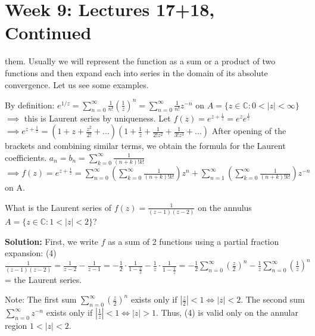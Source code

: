 \documentclass[12pt]{article}
\begin{document}
\section{Week 9: Lectures 17+18, Continued}

them. Usually we will represent the function as a sum or a product of two functions and then expand each into series in the domain of its absolute convergence. Let us see some examples.

\begin{example}
By definition: $e^{1/z} = \sum_{n=0}^\infty \frac{1}{n!}(\frac{1}{z})^n = \sum_{n=0}^\infty \frac{1}{n!}z^{-n}$ on $A = \{z \in \mathbb{C}: 0 < |z| < \infty\}$
$\implies$ this is Laurent series by uniqueness. Let $f(z) = e^{z + \frac{1}{z}} = e^z e^{\frac{1}{z}}$
$\implies e^{z + \frac{1}{z}} = (1 + z + \frac{z^2}{2!} + ...) (1 + \frac{1}{z} + \frac{1}{2!z^2} + \frac{1}{3!z^3} + ...)$
After opening of the brackets and combining similar terms, we obtain the formula for the Laurent coefficients.
$a_n = b_n = \sum_{k=0}^\infty \frac{1}{(n+k)!k!}$
$\implies f(z) = e^{z + \frac{1}{z}} = \sum_{n=0}^\infty (\sum_{k=0}^\infty \frac{1}{(n+k)!k!})z^n + \sum_{n=1}^\infty (\sum_{k=0}^\infty \frac{1}{(n+k)!k!})z^{-n}$ on A.
\end{example}

\begin{example}
What is the Laurent series of $f(z) = \frac{1}{(z-1)(z-2)}$ on the annulus $A = \{z \in \mathbb{C}: 1 < |z| < 2\}$?

\textbf{Solution:} First, we write $f$ as a sum of 2 functions using a partial fraction expansion:
(4) $\frac{1}{(z-1)(z-2)} = \frac{1}{z-2} - \frac{1}{z-1} = -\frac{1}{2} \cdot \frac{1}{1-\frac{z}{2}} - \frac{1}{z} \cdot \frac{1}{1-\frac{1}{z}} = -\frac{1}{2} \sum_{n=0}^\infty (\frac{z}{2})^n - \frac{1}{z} \sum_{n=0}^\infty (\frac{1}{z})^n$ = the Laurent series.

Note: The first sum $\sum_{n=0}^\infty (\frac{z}{2})^n$ exists only if $|\frac{z}{2}| < 1 \iff |z| < 2$.
The second sum $\sum_{n=0}^\infty z^{-n}$ exists only if $|\frac{1}{z}| < 1 \iff |z| > 1$.
Thus, (4) is valid only on the annular region $1 < |z| < 2$.
\end{example}
\end{document}
